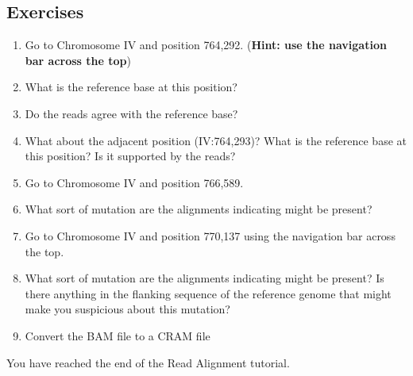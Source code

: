 \documentclass[11pt]{article}
\begin{document}
    \hypertarget{exercises}{%
\subsection{Exercises}\label{exercises}}

\begin{enumerate}
\def\labelenumi{\arabic{enumi}.}
\item
  Go to Chromosome IV and position 764,292. (\textbf{Hint: use the
  navigation bar across the top})
\item
  What is the reference base at this position?
\item
  Do the reads agree with the reference base?
\item
  What about the adjacent position (IV:764,293)? What is the reference
  base at this position? Is it supported by the reads?
\item
  Go to Chromosome IV and position 766,589.
\item
  What sort of mutation are the alignments indicating might be present?
\item
  Go to Chromosome IV and position 770,137 using the navigation bar
  across the top.
\item
  What sort of mutation are the alignments indicating might be present?
  Is there anything in the flanking sequence of the reference genome
  that might make you suspicious about this mutation?
\item
  Convert the BAM file to a CRAM file
\end{enumerate}

    You have reached the end of the Read Alignment tutorial.


\end{document}
